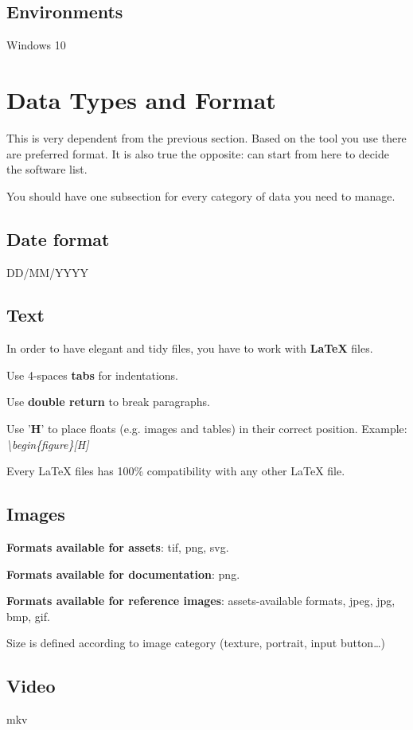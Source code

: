 \documentclass[12pt]{article}
\begin{document}
\subsection{Environments}
Windows 10

\section{Data Types and Format}
This is very dependent from the previous section. Based on the tool you use there are preferred format. It is also true the opposite: can start from here to decide the software list.

You should have one subsection for every category of data you need to manage.

\subsection{Date format}
DD/MM/YYYY

\subsection{Text}
In order to have elegant and tidy files, you have to work with \textbf{LaTeX} files.

Use 4-spaces \textbf{tabs} for indentations.

Use \textbf{double return} to break paragraphs.

Use '\textbf{H}' to place floats (e.g. images and tables) in their correct position. Example: \textit{\textbackslash{}begin\{figure\}[H]}

Every LaTeX files has 100\% compatibility with any other LaTeX file.

\subsection{Images}
\textbf{Formats available for assets}: tif, png, svg.

\textbf{Formats available for documentation}: png.

\textbf{Formats available for reference images}: assets-available formats, jpeg, jpg, bmp, gif.

Size is defined according to image category (texture, portrait, input button…)

\subsection{Video}
mkv
\end{document}
